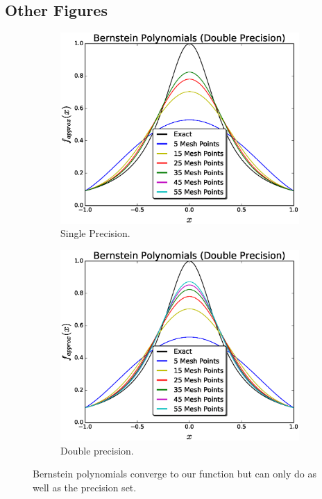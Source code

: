 \documentclass[12pt]{article}
\theoremstyle{remark}
\begin{document}
\subsection{Other Figures}

\begin{figure}[H]
	\centering
	\begin{subfigure}{.5\textwidth}
		\centering
		\includegraphics[width=1.1\linewidth]{bernSingle.eps}
		\caption{Single Precision.}
		\label{fig:sub1}
	\end{subfigure}%
	\begin{subfigure}{.5\textwidth}
		\centering
		\includegraphics[width=1.1\linewidth]{bernDouble.eps}
		\caption{Double precision.}
		\label{fig:sub2}
	\end{subfigure}
	\caption{Bernstein polynomials converge to our function but can only do as well as the precision set.}
	\label{fig:test}
\end{figure}
\end{document}
